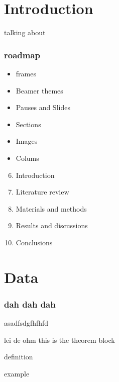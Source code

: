 

\maketitle




\section{Introduction}




\begin{frame}{talking about}

\frametitle{roadmap}

\begin{itemize}
\item frames
\pause
\item Beamer themes
\pause
\item Pauses and Slides
\pause
\item Sections
\pause
\item Images
\pause
\item Colums
\end{itemize}

\begin{enumerate}
\setcounter{enumi}{5}
\itemsep0.75em
\item <1> Introduction
\item Literature review
\item Materials and methods
\item Results and discussions
\item Conclusions
\end{enumerate}

\end{frame}

\section{Data}

\begin{frame}
\frametitle{dah dah dah}

asadfsdgfhfhfd

\begin{theorem}{lei de ohm}
this is the theorem block
\end{theorem}
\begin{definition}
definition
\end{definition}
\begin{example}
example
\end{example}

\end{frame}

